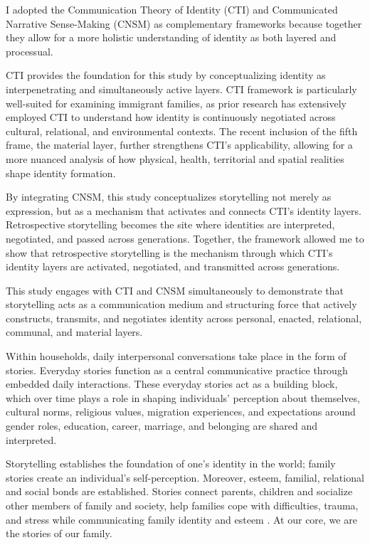 I adopted the Communication Theory of Identity (CTI) and Communicated Narrative Sense-Making (CNSM) as complementary frameworks because together they allow for a more holistic understanding of identity as both layered and processual.

CTI provides the foundation for this study by conceptualizing identity as interpenetrating and simultaneously active layers. CTI framework is particularly well-suited for examining immigrant families, as prior research has extensively employed CTI to understand how identity is continuously negotiated across cultural, relational, and environmental contexts. The recent inclusion of the fifth frame, the material layer, further strengthens CTI’s applicability, allowing for a more nuanced analysis of how physical, health, territorial and spatial realities shape identity formation. 

By integrating CNSM, this study conceptualizes storytelling not merely as expression, but as a mechanism that activates and connects CTI’s identity layers. Retrospective storytelling becomes the site where identities are interpreted, negotiated, and passed across generations. Together, the framework allowed me to show that retrospective storytelling is the mechanism through which CTI’s identity layers are activated, negotiated, and transmitted across generations.

This study engages with CTI and CNSM simultaneously to demonstrate that storytelling acts as a communication medium and structuring force that actively constructs, transmits, and negotiates identity across personal, enacted, relational, communal, and material layers.

Within households, daily interpersonal conversations take place in the form of stories. Everyday stories function as a central communicative practice through embedded daily interactions. These everyday stories act as a building block, which over time plays a role in shaping individuals’ perception about themselves, cultural norms, religious values, migration experiences, and expectations around gender roles, education, career, marriage, and belonging are shared and interpreted.

Storytelling establishes the foundation of one’s identity in the world; family stories create an individual’s self-perception. Moreover, esteem, familial, relational and social bonds are established. Stories connect parents, children and socialize other members of family and society, help families cope with difficulties, trauma, and stress while communicating family identity and esteem \citep{koenigkellasFamilyStoriesStorytelling2012}. At our core, we are the stories of our family.

